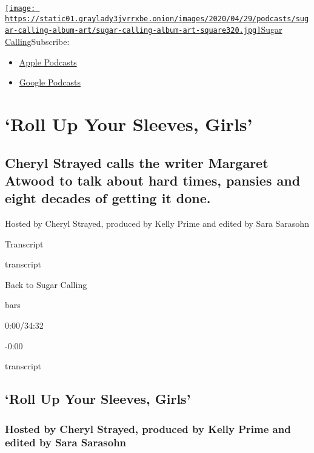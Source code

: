 \href{https://www.nytimes3xbfgragh.onion/column/sugar-calling}{\texttt{[image: https://static01.graylady3jvrrxbe.onion/images/2020/04/29/podcasts/sugar-calling-album-art/sugar-calling-album-art-square320.jpg]}Sugar
Calling}Subscribe:

\begin{itemize}
\tightlist
\item
  \href{https://itunes.apple.com/us/podcast/id1505881384}{Apple
  Podcasts}
\item
  \href{https://podcasts.google.com/?feed=aHR0cHM6Ly9yc3MuYXJ0MTkuY29tL3N1Z2FyLWNhbGxpbmc\&ved=0CAUQrrcFahcKEwjA8Kyn09voAhUAAAAAHQAAAAAQBQ}{Google
  Podcasts}
\end{itemize}

\hypertarget{roll-up-your-sleeves-girls-1}{%
\section{`Roll Up Your Sleeves,
Girls'}\label{roll-up-your-sleeves-girls-1}}

\hypertarget{cheryl-strayed-calls-the-writer-margaret-atwood-to-talk-about-hard-times-pansies-and-eight-decades-of-getting-it-done-1}{%
\subsection{Cheryl Strayed calls the writer Margaret Atwood to talk
about hard times, pansies and eight decades of getting it
done.}\label{cheryl-strayed-calls-the-writer-margaret-atwood-to-talk-about-hard-times-pansies-and-eight-decades-of-getting-it-done-1}}

Hosted by Cheryl Strayed, produced by Kelly Prime and edited by Sara
Sarasohn

Transcript

transcript

Back to Sugar Calling

bars

0:00/34:32

-0:00

transcript

\hypertarget{roll-up-your-sleeves-girls-2}{%
\subsection{`Roll Up Your Sleeves,
Girls'}\label{roll-up-your-sleeves-girls-2}}

\hypertarget{hosted-by-cheryl-strayed-produced-by-kelly-prime-and-edited-by-sara-sarasohn-1}{%
\subsubsection{Hosted by Cheryl Strayed, produced by Kelly Prime and
edited by Sara
Sarasohn}\label{hosted-by-cheryl-strayed-produced-by-kelly-prime-and-edited-by-sara-sarasohn-1}}

